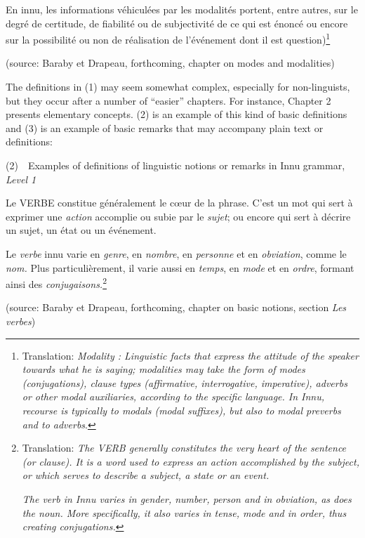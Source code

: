 \documentclass[letterpaper]{article}
\begin{document}
En innu, les informations v\'ehicul\'ees par les modalit\'es portent, entre autres, sur le degr\'e de certitude, de fiabilit\'e ou de subjectivit\'e de ce qui est \'enonc\'e ou encore sur la possibilit\'e ou non de r\'ealisation de l{\textquoteright}\'ev\'enement dont il est question)\footnote{ Translation: \textit{Modality : Linguistic facts that express the attitude of the speaker towards what he is saying; modalities may take the form of modes (conjugations), clause types (affirmative, interrogative, imperative), adverbs or other modal auxiliaries, according to the specific language. In Innu, recourse is typically to modals (modal suffixes), but also to modal preverbs and to adverbs}.}

(source: Baraby et Drapeau, forthcoming, chapter on modes and modalities)

The definitions in (1) may seem somewhat complex, especially for non-linguists, but they occur after a number of {\textquotedblleft}easier{\textquotedblright} chapters. For instance, Chapter 2 presents elementary concepts.  (2) is an example of this kind of basic definitions and (3) is an example of basic remarks that may accompany plain text or definitions:

(2)\ \ Examples of definitions of linguistic notions or remarks in Innu grammar, \textit{Level 1}

Le VERBE constitue g\'en\'eralement le c{\oe}ur de la phrase. C{\textquoteright}est un mot qui sert \`a exprimer une \textit{action} accomplie ou subie par le \textit{sujet}; ou encore qui sert \`a d\'ecrire un sujet, un \'etat ou un \'ev\'enement.

Le \textit{verbe} innu varie en \textit{genre}, en \textit{nombre}, en \textit{personne }et en \textit{obviation}, comme le \textit{nom.} Plus particuli\`ere\-ment, il varie aussi en \textit{temps}, en \textit{mode} et en \textit{ordre}, formant ainsi des \textit{conjugaisons.}\footnote{ Translation: \textit{The VERB generally constitutes the very heart of the sentence (or clause). It is a word used to express an action accomplished by the subject, or which serves to describe a subject, a state or an event.}\par \textit{The verb in Innu varies in gender, number, person and in obviation, as does the noun. More specifically, it also varies in tense, mode and in order, thus creating conjugations}\textit{.}}

(source: Baraby et Drapeau, forthcoming, chapter on basic notions, section \textit{Les verbes})
\end{document}
